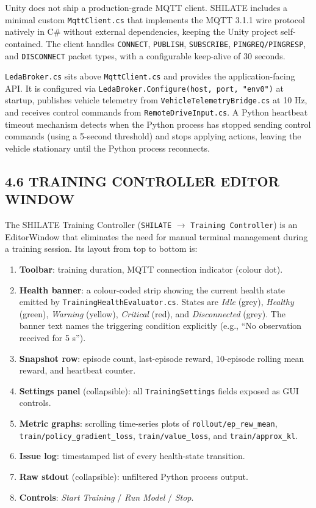 \documentclass[12pt,a4paper]{article}
\begin{document}
\indent Unity does not ship a production-grade MQTT client. SHILATE includes a
minimal custom \texttt{MqttClient.cs} that implements the MQTT 3.1.1 wire
protocol \cite{OASIS2014} natively in C\# without external dependencies,
keeping the Unity project self-contained. The client handles \texttt{CONNECT},
\texttt{PUBLISH}, \texttt{SUBSCRIBE}, \texttt{PINGREQ/PINGRESP}, and
\texttt{DISCONNECT} packet types, with a configurable keep-alive of 30 seconds.

\texttt{LedaBroker.cs} sits above \texttt{MqttClient.cs} and provides the
application-facing API. It is configured via \texttt{LedaBroker.Configure(host,
port, "env0")} at startup, publishes vehicle telemetry from
\texttt{VehicleTelemetryBridge.cs} at 10 Hz, and receives control commands from
\texttt{RemoteDriveInput.cs}. A Python heartbeat timeout mechanism detects when
the Python process has stopped sending control commands (using a 5-second
threshold) and stops applying actions, leaving the vehicle stationary until the
Python process reconnects.

\subsection*{4.6 \quad TRAINING CONTROLLER EDITOR WINDOW}

\indent The SHILATE Training Controller (\texttt{SHILATE} $\to$ \texttt{Training
Controller}) is an EditorWindow that eliminates the need for manual terminal
management during a training session. Its layout from top to bottom is:

\begin{enumerate}[leftmargin=2.5cm]
  \item \textbf{Toolbar}: training duration, MQTT connection indicator (colour dot).
  \item \textbf{Health banner}: a colour-coded strip showing the current health
    state emitted by \texttt{TrainingHealthEvaluator.cs}. States are
    \emph{Idle} (grey), \emph{Healthy} (green), \emph{Warning} (yellow),
    \emph{Critical} (red), and \emph{Disconnected} (grey). The banner text
    names the triggering condition explicitly (e.g., ``No observation received
    for 5 s'').
  \item \textbf{Snapshot row}: episode count, last-episode reward, 10-episode
    rolling mean reward, and heartbeat counter.
  \item \textbf{Settings panel} (collapsible): all \texttt{TrainingSettings}
    fields exposed as GUI controls.
  \item \textbf{Metric graphs}: scrolling time-series plots of
    \texttt{rollout/ep\_rew\_mean}, \texttt{train/policy\_gradient\_loss},
    \texttt{train/value\_loss}, and \texttt{train/approx\_kl}.
  \item \textbf{Issue log}: timestamped list of every health-state transition.
  \item \textbf{Raw stdout} (collapsible): unfiltered Python process output.
  \item \textbf{Controls}: \emph{Start Training} / \emph{Run Model} / \emph{Stop}.
\end{enumerate}
\end{document}
